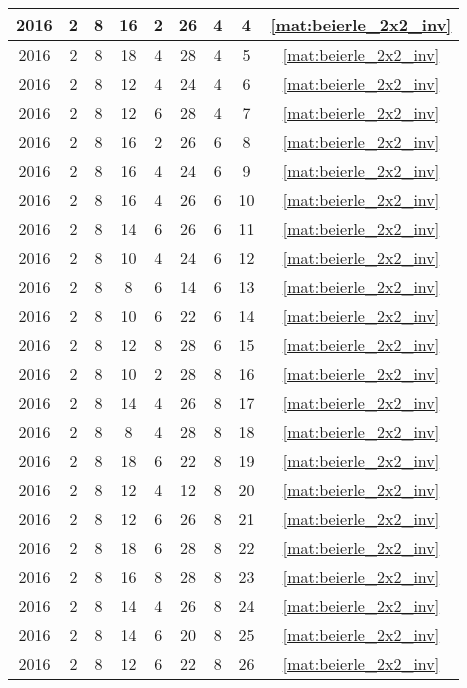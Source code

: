 \begin{longtable}{|c|c|c|c|c|c|c|c|c|}
2016 & 2 & 8 & 16 & 2 & 26 & 4 & 4 & \eqref{mat:beierle_2x2_inv} \\ \hline 
2016 & 2 & 8 & 18 & 4 & 28 & 4 & 5 & \eqref{mat:beierle_2x2_inv} \\ \hline 
2016 & 2 & 8 & 12 & 4 & 24 & 4 & 6 & \eqref{mat:beierle_2x2_inv} \\ \hline 
2016 & 2 & 8 & 12 & 6 & 28 & 4 & 7 & \eqref{mat:beierle_2x2_inv} \\ \hline 
2016 & 2 & 8 & 16 & 2 & 26 & 6 & 8 & \eqref{mat:beierle_2x2_inv} \\ \hline 
2016 & 2 & 8 & 16 & 4 & 24 & 6 & 9 & \eqref{mat:beierle_2x2_inv} \\ \hline 
2016 & 2 & 8 & 16 & 4 & 26 & 6 & 10 & \eqref{mat:beierle_2x2_inv} \\ \hline 
2016 & 2 & 8 & 14 & 6 & 26 & 6 & 11 & \eqref{mat:beierle_2x2_inv} \\ \hline 
2016 & 2 & 8 & 10 & 4 & 24 & 6 & 12 & \eqref{mat:beierle_2x2_inv} \\ \hline 
2016 & 2 & 8 & 8 & 6 & 14 & 6 & 13 & \eqref{mat:beierle_2x2_inv} \\ \hline 
2016 & 2 & 8 & 10 & 6 & 22 & 6 & 14 & \eqref{mat:beierle_2x2_inv} \\ \hline 
2016 & 2 & 8 & 12 & 8 & 28 & 6 & 15 & \eqref{mat:beierle_2x2_inv} \\ \hline 
2016 & 2 & 8 & 10 & 2 & 28 & 8 & 16 & \eqref{mat:beierle_2x2_inv} \\ \hline 
2016 & 2 & 8 & 14 & 4 & 26 & 8 & 17 & \eqref{mat:beierle_2x2_inv} \\ \hline 
2016 & 2 & 8 & 8 & 4 & 28 & 8 & 18 & \eqref{mat:beierle_2x2_inv} \\ \hline 
2016 & 2 & 8 & 18 & 6 & 22 & 8 & 19 & \eqref{mat:beierle_2x2_inv} \\ \hline 
2016 & 2 & 8 & 12 & 4 & 12 & 8 & 20 & \eqref{mat:beierle_2x2_inv} \\ \hline 
2016 & 2 & 8 & 12 & 6 & 26 & 8 & 21 & \eqref{mat:beierle_2x2_inv} \\ \hline 
2016 & 2 & 8 & 18 & 6 & 28 & 8 & 22 & \eqref{mat:beierle_2x2_inv} \\ \hline 
2016 & 2 & 8 & 16 & 8 & 28 & 8 & 23 & \eqref{mat:beierle_2x2_inv} \\ \hline 
2016 & 2 & 8 & 14 & 4 & 26 & 8 & 24 & \eqref{mat:beierle_2x2_inv} \\ \hline 
2016 & 2 & 8 & 14 & 6 & 20 & 8 & 25 & \eqref{mat:beierle_2x2_inv} \\ \hline 
2016 & 2 & 8 & 12 & 6 & 22 & 8 & 26 & \eqref{mat:beierle_2x2_inv} \\ \hline 

\end{longtable}
